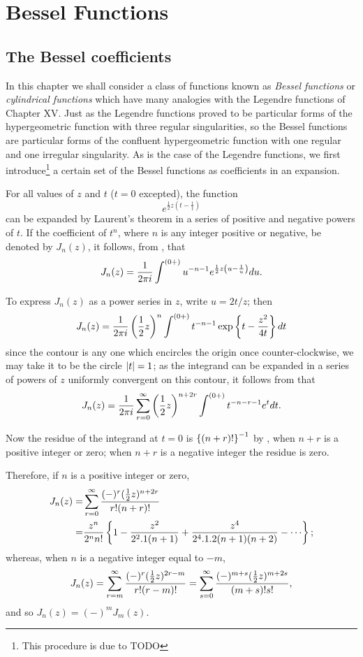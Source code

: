 \documentclass{book}
\begin{document}
\chapter{Bessel Functions}
 \section{The Bessel coefficients}
 In this chapter we shall consider a class of functions known as  \emph{Bessel functions}
 or \emph{cylindrical functions}
 which have many analogies with the Legendre functions of  Chapter XV.
 Just as the Legendre functions proved to be particular forms of the
 hypergeometric function with three regular singularities,  so the
 Bessel functions are particular forms of the  confluent
 hypergeometric function with one regular and one irregular
 singularity. As is the case of the Legendre functions, we first
 introduce\footnote{This procedure is due to TODO \Schlomilch}
 a certain set of the Bessel functions as coefficients in an
 expansion.

 For all values of $z$ and $t$ ($t=0$ excepted), the function
 $$
 e^{ \frac{1}{2} z \left( t - \frac{1}{t} \right)}
 $$
can be expanded by Laurent's theorem in a series of positive and
negative powers of $t$. If the coefficient of $t^n$, where $n$ is any
integer positive or negative, be denoted by $J_n(z)$, it follows, from 
, that 
$$
J_n(z) = \frac{1}{2\pi i} \int^{(0+)} u^{-n-1} e^{\frac{1}{2} z \left( u
    - \frac{1}{u} \right)} d u.
$$

To express $J_n(z)$ as a power series in $z$, write $u = 2t/z$; then
$$
J_n(z) = \frac{1}{2\pi i} \left( \frac{1}{2} z  \right)^n \int^{(0+)} t^{-n-1}
\exp \left\{  t - \frac{z^2}{4t}   \right\} d t
$$
since the contour is any one which encircles the origin once 
counter-clockwise, we may take it to be the circle 
$\left| t \right|=1$; as the integrand can be expanded in a series of powers
of $z$ uniformly convergent on this contour, it follows from
 that 
$$
J_n(z)
=
\frac{1}{2\pi i}
\sum_{r=0}^{\infty} \left( \frac{1}{2} z \right)^{n+2r} 
\int^{(0+)} t^{-n-r-1} e^t d t.
$$

Now the residue of the integrand at $t=0$ is 
$\left\{  (n+r)!   \right\}^{-1}$ by 
, when $n+r$ is a positive 
integer or zero; when $n+r$ is a negative integer 
the residue is zero.

Therefore, if $n$ is a positive integer or zero, 
\begin{align*}
J_n(z) =& \sum_{r=0}^{\infty} \frac{ (-)^r (\half z)^{n+2r} }{
  r!(n+r)! } \\
=& \frac{ z^n }{ 2^n n! } 
\thebrace{ 1 - \frac{z^2}{2^2.1(n+1)} + \frac{z^4}{2^4.1.2(n+1)(n+2)}
  - \cdots };
\end{align*}
%
%
whereas, when $n$ is a negative integer equal to $-m$,
$$
J_n(z)
= \sum_{r=m}^{\infty} \frac{ (-)^r (\frac{1}{2} z)^{2r-m} }{ r!(r-m)!  }
  = \sum_{s=0}^{\infty} \frac{ (-)^{m+s} (\frac{1}{2} z)^{m+2s}  }{ (m+s)! s!  },
  $$
  and so $J_n(z) = (-)^m J_m(z)$.
\end{document}
